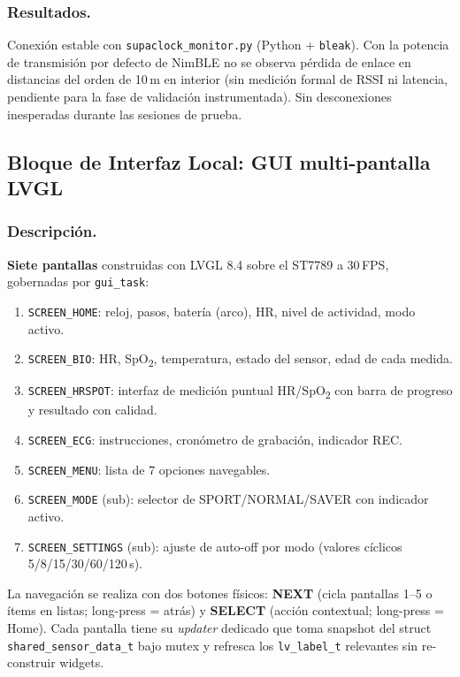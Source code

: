 \documentclass[letterpaper,11pt]{article}
\begin{document}
\subsubsection{Resultados.} Conexión estable con \texttt{supaclock\_monitor.py} (Python +
\texttt{bleak}). Con la potencia de transmisión por defecto de NimBLE no se observa pérdida
de enlace en distancias del orden de 10\,m en interior (sin medición formal de RSSI ni
latencia, pendiente para la fase de validación instrumentada). Sin desconexiones inesperadas
durante las sesiones de prueba.

\subsection{Bloque de Interfaz Local: GUI multi-pantalla LVGL}
\subsubsection{Descripción.} \textbf{Siete pantallas} construidas con LVGL 8.4 sobre el ST7789
a 30\,FPS, gobernadas por \texttt{gui\_task}:
\begin{enumerate}
    \item \texttt{SCREEN\_HOME}: reloj, pasos, batería (arco), HR, nivel de actividad, modo activo.
    \item \texttt{SCREEN\_BIO}: HR, SpO\textsubscript{2}, temperatura, estado del sensor, edad de
    cada medida.
    \item \texttt{SCREEN\_HRSPOT}: interfaz de medición puntual HR/SpO\textsubscript{2} con
    barra de progreso y resultado con calidad.
    \item \texttt{SCREEN\_ECG}: instrucciones, cronómetro de grabación, indicador REC.
    \item \texttt{SCREEN\_MENU}: lista de 7 opciones navegables.
    \item \texttt{SCREEN\_MODE} (sub): selector de SPORT/NORMAL/SAVER con indicador activo.
    \item \texttt{SCREEN\_SETTINGS} (sub): ajuste de auto-off por modo (valores cíclicos
    5/8/15/30/60/120\,s).
\end{enumerate}
La navegación se realiza con dos botones físicos: \textbf{NEXT} (cicla pantallas 1--5 o ítems
en listas; long-press = atrás) y \textbf{SELECT} (acción contextual; long-press = Home).
Cada pantalla tiene su \textit{updater} dedicado que toma snapshot del struct
\texttt{shared\_sensor\_data\_t} bajo mutex y refresca los \texttt{lv\_label\_t} relevantes
sin re-construir widgets.
\end{document}
